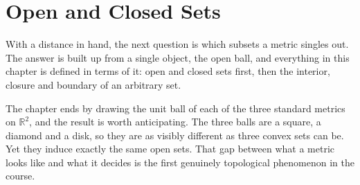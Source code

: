 \chapter{Open and Closed Sets}
\label{ch:open_closed}

With a distance in hand, the next question is which subsets a metric singles out. The answer is
built up from a single object, the open ball, and everything in this chapter is defined in terms
of it: open and closed sets first, then the interior, closure and boundary of an arbitrary set.

The chapter ends by drawing the unit ball of each of the three standard metrics on
$\mathbb{R}^2$, and the result is worth anticipating. The three balls are a square, a diamond and
a disk, so they are as visibly different as three convex sets can be. Yet they induce exactly the
same open sets. That gap between what a metric looks like and what it decides is the first
genuinely topological phenomenon in the course.





